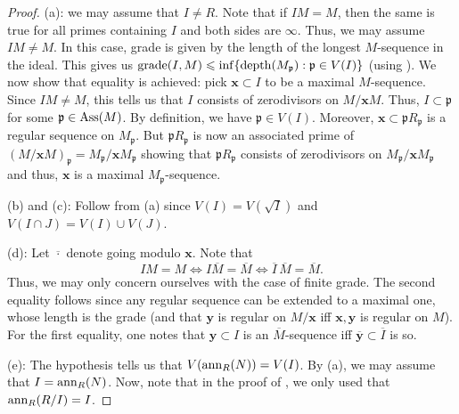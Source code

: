 \documentclass[12pt]{article}
\begin{document}
\begin{proof} 
	(a): we may assume that $I \neq R$. Note that if $IM = M$, then the same is true for all primes containing $I$ and both sides are $\infty$. Thus, we may assume $IM \neq M$. In this case, grade is given by the length of the longest $M$-sequence in the ideal. This gives us $\operatorname{grade}(I, M) \leqslant \inf\{\operatorname{depth}(M_{\mathfrak{p}}) : \mathfrak{p} \in V(I)\}$ (using ). \newline
	We now show that equality is achieved: pick $\mathbf{x} \subset I$ to be a maximal $M$-sequence. Since $IM \neq M$, this tells us that $I$ consists of zerodivisors on $M/\mathbf{x} M$. Thus, $I \subset \mathfrak{p}$ for some $\mathfrak{p} \in \operatorname{Ass}(M)$. By definition, we have $\mathfrak{p} \in V(I)$. Moreover, $\mathbf{x} \subset \mathfrak{p} R_{\mathfrak{p}}$ is a regular sequence on $M_{\mathfrak{p}}$. But $\mathfrak{p} R_{\mathfrak{p}}$ is now an associated prime of $(M/\mathbf{x} M)_{\mathfrak{p}} = M_{\mathfrak{p}}/\mathbf{x} M_{\mathfrak{p}}$ showing that $\mathfrak{p} R_{\mathfrak{p}}$ consists of zerodivisors on $M_{\mathfrak{p}}/\mathbf{x} M_{\mathfrak{p}}$ and thus, $\mathbf{x}$ is a maximal $M_{\mathfrak{p}}$-sequence.

	(b) and (c): Follow from (a) since $V(I) = V(\sqrt{I})$ and $V(I \cap J) = V(I) \cup V(J)$.

	(d): Let $\overline{\cdot}$ denote going modulo $\mathbf{x}$. Note that
	\begin{equation*} 
		IM = M \Leftrightarrow I \overline{M} = \overline{M} \Leftrightarrow \overline{I} \, \overline{M} = \overline{M}.
	\end{equation*}
	Thus, we may only concern ourselves with the case of finite grade. The second equality follows since any regular sequence can be extended to a maximal one, whose length is the grade (and that $\mathbf{y}$ is regular on $M/\mathbf{x}$ iff $\mathbf{x}, \mathbf{y}$ is regular on $M$). For the first equality, one notes that $\mathbf{y} \subset I$ is an $\overline{M}$-sequence iff $\overline{\mathbf{y}} \subset \overline{I}$ is so.

	(e): The hypothesis tells us that $V(\operatorname{ann}_{R}(N)) = V(I)$. By (a), we may assume that $I = \operatorname{ann}_{R}(N)$. Now, note that in the proof of , we only used that $\operatorname{ann}_{R}(R/I) = I$. 
\end{proof}
\end{document}

